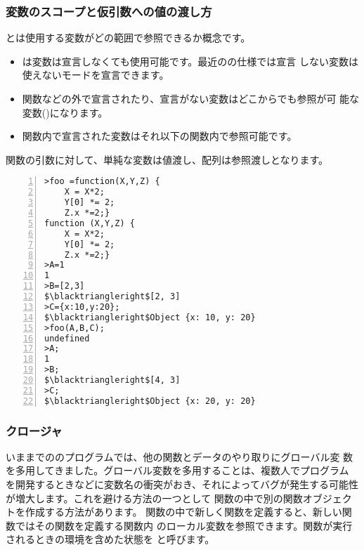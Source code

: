 \subsubsection{変数のスコープと仮引数への値の渡し方}
とは使用する変数がどの範囲で参照できるか概念です。
\begin{itemize}
 \item \JS は変数は宣言しなくても使用可能です。最近の\JS の仕様では宣言
			 しない変数は使えないモードを宣言できます。
 \item 関数などの外で宣言されたり、宣言がない変数はどこからでも参照が可
			 能な変数()になります。
 \item 関数内で宣言された変数はそれ以下の関数内で参照可能です。
\end{itemize}
関数の引数に対して、単純な変数は値渡し、配列は参照渡しとなります。
\begin{Verbatim}[numbers=left, fontsize=\small,
	commandchars=\\//,codes={\catcode`$=3\catcode`^=7}]
>foo =function(X,Y,Z) {
    X = X*2;
    Y[0] *= 2;
    Z.x *=2;}
function (X,Y,Z) {
    X = X*2;
    Y[0] *= 2;
    Z.x *=2;}
>A=1
1
>B=[2,3]
$\blacktriangleright$[2, 3]
>C={x:10,y:20};
$\blacktriangleright$Object {x: 10, y: 20}
>foo(A,B,C);
undefined
>A;
1
>B;
$\blacktriangleright$[4, 3]
>C;
$\blacktriangleright$Object {x: 20, y: 20}
\end{Verbatim}
\subsubsection{クロージャ}
いままでの\JS のプログラムでは、他の関数とデータのやり取りにグローバル変
数を多用してきました。グローバル変数を多用することは、複数人でプログラム
を開発するときなどに変数名の衝突がおき、それによってバグが発生する可能性
が増大します。これを避ける方法の一つとして%
関数の中で別の関数オブジェクトを作成する方法があります。
関数の中で新しく関数を定義すると、新しい関数ではその関数を定義する関数内
のローカル変数を参照できます。関数が実行されるときの環境を含めた状態を
と呼びます。


